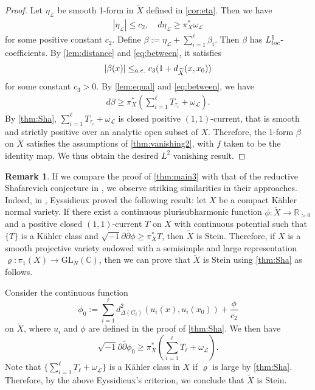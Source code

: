 \documentclass[11pt,a4paper,english]{smfart}
\theoremstyle{plain}
\theoremstyle{definition}
\newtheorem{remark}[theorem]{Remark}
\theoremstyle{plain}
\newcommand\GL{\mathrm{GL}}
\def\hess{\sqrt{-1}\partial\bar{\partial}}
\def\bR{\mathbb{R}}
\def\bC{\mathbb{C}}
\def\cL{\mathcal{L}}
\begin{document}
\begin{proof}
		
		Let $\eta_\cL$ be  smooth 1-form in $\widetilde{X}$ defined in \cref{cor:eta}. Then we have 
		\begin{align} \label{eq:between}
|\eta_\cL|\leq c_2,\quad d\eta_\cL\geq \pi_X^*\omega_\cL 
		\end{align}  
		for some positive constant $ c_2$.    
	Define 
 $\beta:=\eta_\cL+\sum_{i=1}^{\ell}\beta_i$.  Then $\beta$ has $L_{\rm loc}^1$-coefficients. By \cref{lem:distance} and \eqref{eq:between}, it satisfies 
\begin{align}\label{eq:dsub}
	  |\beta(x)|\leq_{\rm a.e.} c_3(1+d_{\widetilde{X}}(x, x_0)) 
\end{align} 
	 for some constant $c_3>0$.   	By \cref{lem:equal} and \eqref{eq:between}, 	  we have
	 \begin{align*} d\beta\geq   \pi_X^*(\sum_{i=1}^{\ell}T_{\tau_i}+\omega_{\cL} ). 
	 \end{align*}   
 By  \cref{thm:Sha}, $\sum_{i=1}^{\ell}T_{\tau_i}+\omega_{\cL}$ is closed positive $(1,1)$-current, that is smooth and strictly positive over an analytic   open subset of $X$.  Therefore,   the 1-form $\beta$ on $\widetilde{X}$ satisfies the assumptions of \cref{thm:vanishing2}, with $f$ taken to be the identity map. We thus obtain the desired $L^2$ vanishing result.
	\end{proof} 
	\begin{remark}\label{rem:final}
		If we compare the proof of \cref{thm:main3}  with that  of the reductive Shafarevich conjecture in \cite{DY23,Eys04}, we observe striking similarities in their approaches. 
		Indeed, in \cite[Proposition 4.1.1]{Eys04}, Eyssidieux proved the following result: let $X$ be   a compact K\"ahler normal variety. If there exist a continuous plurisubharmonic function $\phi:\widetilde{X}\to \bR_{>0}$ and a positive closed $(1,1)$-current $T$ on $X$ with continuous potential such that  $\{T\}$ is a K\"ahler class and  $\hess\phi\geq \pi_X^*T$, then $\widetilde{X}$ is Stein. Therefore, if $X$ is a smooth projective variety endowed with a  semisimple and large representation $\varrho:\pi_1(X)\to \GL_N(\bC)$, then we can prove that $\widetilde{X}$  is Stein using \cref{thm:Sha} as follows. 
		
		Consider the continuous function
		$$
		\phi_0:=\sum_{i=1}^{\ell}	 d^2_{\Delta(G_i)}(u_i(x),u_i(x_0))+\frac{\phi}{c_2}
		$$
		on $\widetilde{X}$, where $u_i$ and $\phi$ are defined  in the proof of \cref{thm:Sha}. We then have
		$$
		\hess\phi_0\geq \pi_X^*(\sum_{i=1}^{\ell}T_\ell+ \omega_\cL).
		$$
		Note that $\{ \sum_{i=1}^{\ell} T_\ell+\omega_\cL\}$ is a K\"ahler class in $X$ if $\varrho$ is large by \cref{thm:Sha}. Therefore, by the above Eyssidieux's criterion, we conclude that $\widetilde{X}$ is Stein. 	
	\end{remark}
	
\end{document}
